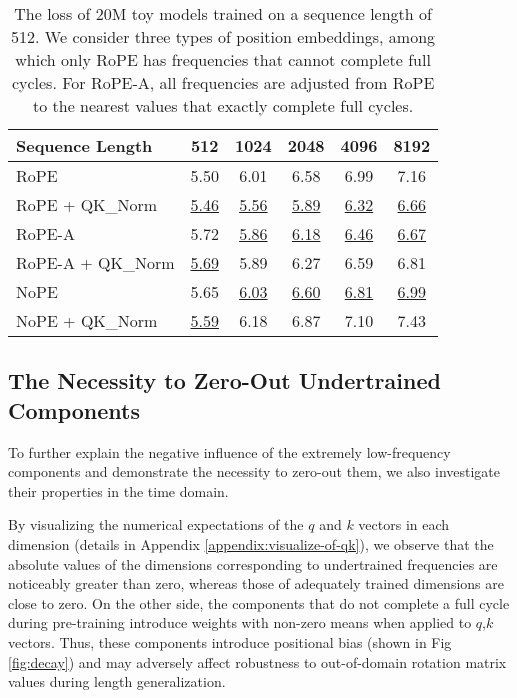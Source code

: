 \begin{table}[t]
    \centering
    \begin{adjustbox}{width=0.48\textwidth}
    \begin{tabular}{l|c|c|c|c|c}
        \toprule
        \textbf{Sequence Length} & \textbf{512} & \textbf{1024} & \textbf{2048} & \textbf{4096} & \textbf{8192} \\
        \midrule
        RoPE & 5.50 & 6.01 & 6.58 & 6.99 & 7.16\\
        RoPE + QK\_Norm & \underline{5.46} & \underline{5.56} & \underline{5.89} & \underline{6.32} & \underline{6.66} \\
        \midrule
        RoPE-A & 5.72 & \underline{5.86} & \underline{6.18} & \underline{6.46} & \underline{6.67}\\
        RoPE-A + QK\_Norm & \underline{5.69} & 5.89 & 6.27 & 6.59 & 6.81 \\
        \midrule
        NoPE & 5.65 & \underline{6.03} & \underline{6.60} & \underline{6.81} & \underline{6.99} \\
        NoPE + QK\_Norm & \underline{5.59} & 6.18 & 6.87 & 7.10 & 7.43 \\
        \bottomrule
        \end{tabular}
    \end{adjustbox}
    \caption{The loss of 20M toy models trained on a sequence length of 512. We consider three types of position embeddings, among which only RoPE has frequencies that cannot complete full cycles. For RoPE-A, all frequencies are adjusted from RoPE to the nearest values that exactly complete full cycles.}
    \label{tab:qk_norm}
\end{table}

\subsection{The Necessity to Zero-Out Undertrained Components}
\label{subsec:analysis}
To further explain the negative influence of the extremely low-frequency components and demonstrate the necessity to zero-out them, we also investigate their properties in the time domain.

By visualizing the numerical expectations of the $q$ and $k$ vectors in each dimension (details in Appendix \ref{appendix:visualize-of-qk}), we observe that the absolute values of the dimensions corresponding to undertrained frequencies are noticeably greater than zero, whereas those of adequately trained dimensions are close to zero.
On the other side, the components that do not complete a full cycle during pre-training introduce weights with non-zero means when applied to $q$,$k$ vectors. Thus, these components introduce positional bias (shown in Fig \ref{fig:decay}) and may adversely affect robustness to out-of-domain rotation matrix values during length generalization.

